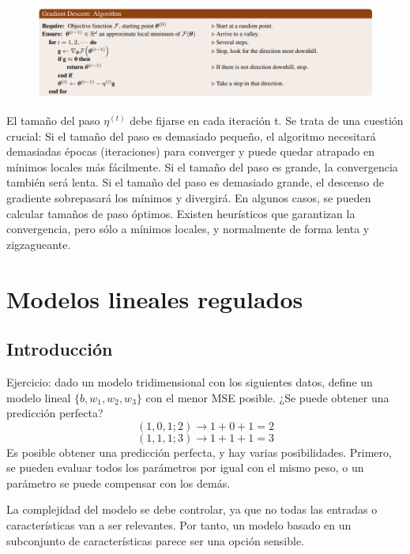 \begin{figure}[h]
\centering
\includegraphics[width = \textwidth]{figs/gradient-descend-alg.png}
\end{figure}

El tamaño del paso $\eta^{(t)}$ debe fijarse en cada iteración t. Se trata de una cuestión crucial: Si el tamaño del paso es demasiado pequeño, el algoritmo necesitará demasiadas épocas (iteraciones) para converger y puede quedar atrapado en mínimos locales más fácilmente. Si el tamaño del paso es grande, la convergencia también será lenta. Si el tamaño del paso es demasiado grande, el descenso de gradiente sobrepasará los mínimos y divergirá. En algunos casos, se pueden calcular tamaños de paso óptimos.
Existen heurísticos que garantizan la convergencia, pero sólo a mínimos locales, y normalmente de forma lenta y zigzagueante.

\section{Modelos lineales regulados}
\subsection{Introducción}
Ejercicio: dado un modelo tridimensional con los siguientes datos, define un modelo lineal $\{b, w_1, w_2, w_3\}$ con el menor MSE posible. ¿Se puede obtener una predicción perfecta?
$$(1,0,1; 2) \rightarrow 1 + 0 + 1 = 2$$
$$(1,1,1;3) \rightarrow 1 + 1 + 1 = 3$$
Es posible obtener una predicción perfecta, y hay varias posibilidades. Primero, se pueden evaluar todos los parámetros por igual con el mismo peso, o un parámetro se puede compensar con los demás. 

La complejidad del modelo se debe controlar, ya que no todas las entradas o características van a ser relevantes. Por tanto, un modelo basado en un subconjunto de características parece ser una opción sensible.

